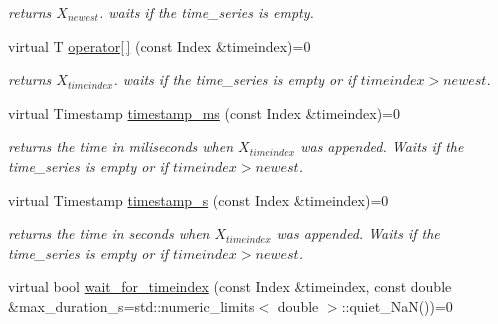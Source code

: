 \begin{DoxyCompactItemize}
\begin{DoxyCompactList}\small\item\em returns $ X_{newest} $. waits if the time\+\_\+series is empty. \end{DoxyCompactList}\item 
virtual T \hyperlink{classtime__series_1_1TimeSeriesInterface_a3149f64961e08315eb06798d0f075333}{operator\mbox{[}$\,$\mbox{]}} (const Index \&timeindex)=0\hypertarget{classtime__series_1_1TimeSeriesInterface_a3149f64961e08315eb06798d0f075333}{}\label{classtime__series_1_1TimeSeriesInterface_a3149f64961e08315eb06798d0f075333}

\begin{DoxyCompactList}\small\item\em returns $ X_{timeindex} $. waits if the time\+\_\+series is empty or if $timeindex > newest $. \end{DoxyCompactList}\item 
virtual Timestamp \hyperlink{classtime__series_1_1TimeSeriesInterface_aaeb745c8c13170a645b25170f0b035f1}{timestamp\+\_\+ms} (const Index \&timeindex)=0\hypertarget{classtime__series_1_1TimeSeriesInterface_aaeb745c8c13170a645b25170f0b035f1}{}\label{classtime__series_1_1TimeSeriesInterface_aaeb745c8c13170a645b25170f0b035f1}

\begin{DoxyCompactList}\small\item\em returns the time in miliseconds when $ X_{timeindex} $ was appended. Waits if the time\+\_\+series is empty or if $timeindex > newest $. \end{DoxyCompactList}\item 
virtual Timestamp \hyperlink{classtime__series_1_1TimeSeriesInterface_acfb468e6e1766fe4b566189d3b888e4d}{timestamp\+\_\+s} (const Index \&timeindex)=0\hypertarget{classtime__series_1_1TimeSeriesInterface_acfb468e6e1766fe4b566189d3b888e4d}{}\label{classtime__series_1_1TimeSeriesInterface_acfb468e6e1766fe4b566189d3b888e4d}

\begin{DoxyCompactList}\small\item\em returns the time in seconds when $ X_{timeindex} $ was appended. Waits if the time\+\_\+series is empty or if $timeindex > newest $. \end{DoxyCompactList}\item 
virtual bool \hyperlink{classtime__series_1_1TimeSeriesInterface_aa09c55259a1f34491b5ecdd1505ffdbf}{wait\+\_\+for\+\_\+timeindex} (const Index \&timeindex, const double \&max\+\_\+duration\+\_\+s=std\+::numeric\+\_\+limits$<$ double $>$\+::quiet\+\_\+\+NaN())=0\hypertarget{classtime__series_1_1TimeSeriesInterface_aa09c55259a1f34491b5ecdd1505ffdbf}{}\label{classtime__series_1_1TimeSeriesInterface_aa09c55259a1f34491b5ecdd1505ffdbf}


\end{DoxyCompactItemize}
